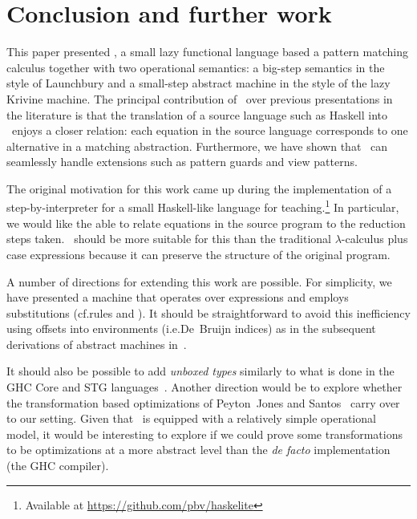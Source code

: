 
\section{Conclusion and further work}\label{sec:conclusion}

This paper presented \lambdaPMC, a small lazy functional language
based a pattern matching calculus together with two operational
semantics: a big-step semantics in the style of Launchbury and a
small-step abstract machine in the style of the lazy Krivine machine.
The principal contribution of \lambdaPMC\ over previous presentations
in the literature is that the translation of a source language such as
Haskell into \lambdaPMC\ enjoys a closer relation: each equation in
the source language corresponds to one alternative in a matching
abstraction.  Furthermore, we have shown that \lambdaPMC\ can
seamlessly handle extensions such as pattern guards and view patterns.

The original motivation for this work came up during the
implementation of a step-by-interpreter for a small Haskell-like
language for teaching.\footnote{Available at
  \url{https://github.com/pbv/haskelite}} In particular, we would like
the able to relate equations in the source program to the reduction
steps taken.  \lambdaPMC\ should be more suitable for this than the
traditional $\lambda$-calculus plus case expressions because
it can preserve the structure of the original program.

A number of directions for extending this work are possible.  For
simplicity, we have presented a machine that operates over expressions
and employs substitutions (cf.\@ rules  and
).  It should be straightforward to avoid this
inefficiency using offsets into environments (i.e.\@ De~Bruijn
indices) as in the subsequent derivations of abstract machines
in~\cite{sestof_1997}.

It should also be possible to add \emph{unboxed types} similarly to
what is done in the GHC Core and STG languages~\cite{jones_1992}.
Another direction would be to explore whether the transformation based
optimizations of Peyton~Jones and Santos~\cite{peytonjones_1997a}
carry over to our setting.  Given that \lambdaPMC\ is equipped with a
relatively simple operational model, it would be interesting to
explore if we could prove some transformations to be optimizations
at a more abstract level than the \emph{de facto} implementation (the
GHC compiler).



